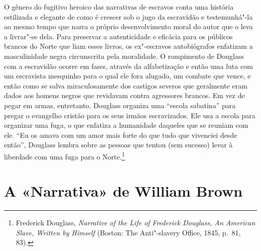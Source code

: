 O gênero do fugitivo heroico das narrativas de escravos conta uma
história estilizada e elegante de como é crescer sob o jugo da
escravidão e testemunhá"-la ao mesmo tempo que narra o próprio
desenvolvimento moral do autor que o leva a livrar"-se dela. Para
preservar a autenticidade e eficácia para os públicos brancos do Norte
que liam esses livros, os ex"-escravos autobiógrafos enfatizam a
masculinidade negra circunscrita pela moralidade. O rompimento de
Douglass com a escravidão ocorre em fases, através da alfabetização e
então uma luta com um escravista mesquinho para o qual ele fora alugado,
um combate que vence, e então como se salva miraculosamente dos castigos
severos que geralmente eram dados aos homens negros que revidavam contra
agressores brancos. Em vez de pegar em armas, entretanto, Douglass
organiza uma ``escola sabatina'' para pregar o evangelho cristão para os
seus irmãos escravizados. Ele usa a escola para organizar uma fuga, o
que enfatiza a humanidade daqueles que se reuniam com ele. ``Eu os amava
com um amor mais forte do que tudo que vivenciei desde então'', Douglass
lembra sobre as pessoas que tentou (sem sucesso) levar à liberdade com
uma fuga para o Norte.\footnote{Frederick Douglass, \emph{Narrative of
  the Life of Frederick Douglass, An American Slave, Written by Himself}
  (Boston: The Anti"-slavery Office, 1845, p.~81, 83).}

\section{A «Narrativa» de William Brown}

